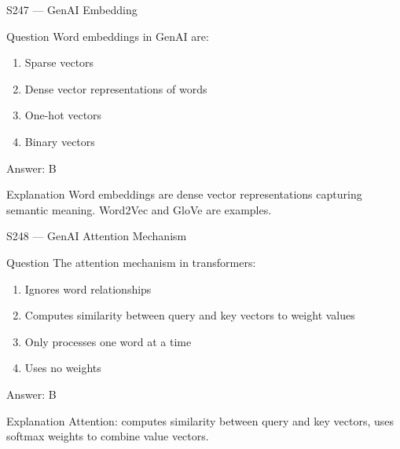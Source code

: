 \documentclass[aspectratio=169,8pt]{beamer}
\begin{document}
	\begin{frame}{S247 --- GenAI Embedding}
		\begin{block}{Question}
			Word embeddings in GenAI are:
			\begin{enumerate}
				\item Sparse vectors
				\item Dense vector representations of words
				\item One-hot vectors
				\item Binary vectors
			\end{enumerate}
		\end{block}
		\begin{exampleblock}{Answer: B}\end{exampleblock}
		\begin{block}{Explanation}
			Word embeddings are dense vector representations capturing semantic meaning. Word2Vec and GloVe are examples.
		\end{block}
	\end{frame}
	
	\begin{frame}{S248 --- GenAI Attention Mechanism}
		\begin{block}{Question}
			The attention mechanism in transformers:
			\begin{enumerate}
				\item Ignores word relationships
				\item Computes similarity between query and key vectors to weight values
				\item Only processes one word at a time
				\item Uses no weights
			\end{enumerate}
		\end{block}
		\begin{exampleblock}{Answer: B}\end{exampleblock}
		\begin{block}{Explanation}
			Attention: computes similarity between query and key vectors, uses softmax weights to combine value vectors.
		\end{block}
	\end{frame}
	
\end{document}
